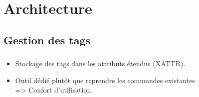 \documentclass[10pt]{beamer}
\begin{document}
\section{Architecture}
\subsection{Gestion des tags}
\begin{frame}
    \frametitle{\subsecname}
    \begin{itemize}
        \item Stockage des tags dans les attributs étendus (XATTR).
        \pause
        \item Outil dédié plutôt que reprendre les commandes existantes \\ => Confort d'utilisation.
    \end{itemize}
\end{frame}
\end{document}
